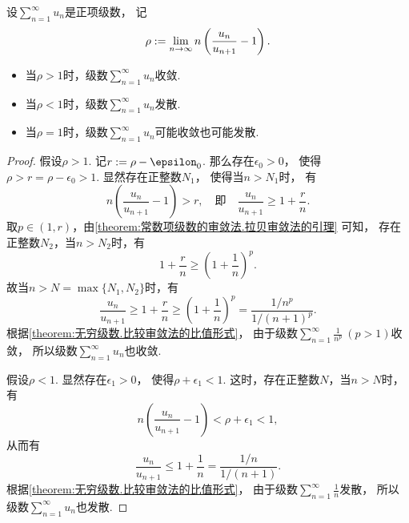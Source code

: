 \begin{theorem}[拉贝审敛法]
设\(\sum_{n=1}^\infty u_n\)是正项级数，
记\[
	\rho := \lim_{n\to\infty} n \left(\frac{u_n}{u_{n+1}} - 1\right).
\]
\begin{itemize}
	\item 当\(\rho>1\)时，级数\(\sum_{n=1}^\infty u_n\)收敛.
	\item 当\(\rho<1\)时，级数\(\sum_{n=1}^\infty u_n\)发散.
	\item 当\(\rho=1\)时，级数\(\sum_{n=1}^\infty u_n\)可能收敛也可能发散.
\end{itemize}
\begin{proof}
假设\(\rho>1\).
记\(r \defeq \rho-\epsilon_0\).
那么存在\(\epsilon_0>0\)，
使得\(\rho>r=\rho-\epsilon_0>1\).
显然存在正整数\(N_1\)，
使得当\(n>N_1\)时，
有\[
	n \left(\frac{u_n}{u_{n+1}}-1\right) > r,
	\quad\text{即}\quad
	\frac{u_n}{u_{n+1}} \geq 1+\frac{r}{n}.
\]
取\(p\in(1,r)\)，由\cref{theorem:常数项级数的审敛法.拉贝审敛法的引理} 可知，
存在正整数\(N_2\)，当\(n>N_2\)时，有\[
	1+\frac{r}{n} \geq \left(1+\frac1n\right)^p.
\]
故当\(n>N=\max\{N_1,N_2\}\)时，有\[
	\frac{u_n}{u_{n+1}}
	\geq 1+\frac{r}{n}
	\geq \left(1+\frac1n\right)^p
	= \frac{1/n^p}{1/(n+1)^p}.
\]
根据\cref{theorem:无穷级数.比较审敛法的比值形式}，
由于级数\(\sum_{n=1}^\infty \frac1{n^p}\ (p>1)\)收敛，
所以级数\(\sum_{n=1}^\infty u_n\)也收敛.

假设\(\rho<1\).
显然存在\(\epsilon_1>0\)，
使得\(\rho+\epsilon_1<1\).
这时，存在正整数\(N\)，当\(n>N\)时，有\[
	n \left(\frac{u_n}{u_{n+1}}-1\right)
	< \rho+\epsilon_1
	< 1,
\]
从而有\[
	\frac{u_n}{u_{n+1}}
	\leq 1+\frac1n
	= \frac{1/n}{1/(n+1)}.
\]
根据\cref{theorem:无穷级数.比较审敛法的比值形式}，
由于级数\(\sum_{n=1}^\infty \frac1n\)发散，
所以级数\(\sum_{n=1}^\infty u_n\)也发散.
\end{proof}
\end{theorem}


